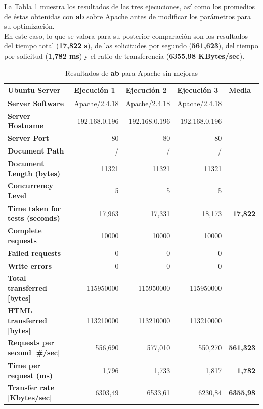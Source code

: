 La Tabla \ref{tab:sinmejora} muestra los resultados de las tres ejecuciones, así como los promedios de éstas obtenidas con \textbf{ab} sobre Apache antes de modificar los parámetros para su optimización.
\\

En este caso, lo que se valora para su posterior comparación son los resultados del tiempo total (\textbf{17,822 s}), de las solicitudes por segundo (\textbf{561,623}), del tiempo por solicitud (\textbf{1,782 ms}) y el ratio de transferencia (\textbf{6355,98 KBytes/sec}).

\begin{table}[H]
	\centering
	\begin{tabular}{lrrrr}
		\textbf{Ubuntu Server} & \multicolumn{1}{l}{\textbf{Ejecución 1}} & \multicolumn{1}{l}{\textbf{Ejecución 2}} & \multicolumn{1}{l}{\textbf{Ejecución 3}} & \multicolumn{1}{l}{\textbf{Media}} \\
		\midrule
		\textbf{Server Software} & Apache/2.4.18 & Apache/2.4.18 & Apache/2.4.18 &  \\
		\textbf{Server Hostname} & 192.168.0.196 & 192.168.0.196 & 192.168.0.196 &  \\
		\textbf{Server Port} & 80    & 80    & 80    &  \\
		\textbf{Document Path} & /     & /     & /     &  \\
		\textbf{Document Length (bytes)} & 11321 & 11321 & 11321 &  \\
		\textbf{Concurrency Level} & 5       & 5       & 5       &  \\
		\textbf{Time taken for tests (seconds)} & 17,963 & 17,331 & 18,173 & \textbf{17,822} \\
		\textbf{Complete requests} & 10000 & 10000 & 10000 &  \\
		\textbf{Failed requests} & 0     & 0     & 0     &  \\
		\textbf{Write errors} & 0     & 0     & 0     &  \\
		\textbf{Total transferred [bytes]} & 115950000 & 115950000 & 115950000 &  \\
		\textbf{HTML transferred [bytes]} & 113210000 & 113210000 & 113210000 &  \\
		\textbf{Requests per second [\#/sec]} & 556,690 & 577,010 & 550,270 & \textbf{561,323} \\
		\textbf{Time per request (ms)} & 1,796 & 1,733 & 1,817 & \textbf{1,782} \\
		\textbf{Transfer rate [Kbytes/sec]} & 6303,49 & 6533,61 & 6230,84 & \textbf{6355,98} \\
	\end{tabular}%
	\caption{Resultados de \textbf{ab} para Apache sin mejoras}
	\label{tab:sinmejora}%
\end{table}%

